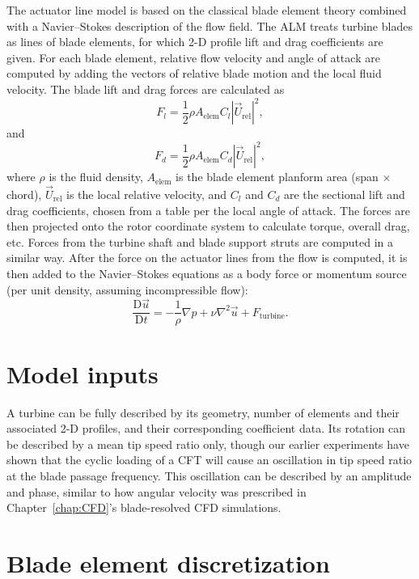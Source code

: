 The actuator line model is based on the classical blade element theory combined
with a Navier--Stokes description of the flow field. The ALM treats turbine
blades as lines of blade elements, for which 2-D profile lift and drag
coefficients are given. For each blade element, relative flow velocity and angle
of attack are computed by adding the vectors of relative blade motion and the
local fluid velocity. The blade lift and drag forces are calculated as
\begin{equation}
    F_l = \frac{1}{2} \rho A_\mathrm{elem} C_l |\vec{U}_\mathrm{rel}|^2,
\end{equation}
and
\begin{equation}
    F_d = \frac{1}{2} \rho A_\mathrm{elem} C_d |\vec{U}_\mathrm{rel}|^2,
\end{equation}
where $\rho$ is the fluid density, $A_\mathrm{elem}$ is the blade element
planform area (span $\times$ chord), $\vec{U}_\mathrm{rel}$ is the local
relative velocity, and $C_l$ and $C_d$ are the sectional lift and drag
coefficients, chosen from a table per the local angle of attack. The forces are
then projected onto the rotor coordinate system to calculate torque, overall
drag, etc. Forces from the turbine shaft and blade support struts are computed
in a similar way. After the force on the actuator lines from the flow is
computed, it is then added to the Navier--Stokes equations as a body force or
momentum source (per unit density, assuming incompressible flow):
\begin{equation}
    \frac{\mathrm{D} \vec{u}}{\mathrm{D} t} = - \frac{1}{\rho} \nabla p + \nu
    \nabla^2 \vec{u} + F_\mathrm{turbine}.
\end{equation}


\section{Model inputs}

A turbine can be fully described by its geometry, number of elements and their
associated 2-D profiles, and their corresponding coefficient data. Its rotation
can be described by a mean tip speed ratio only, though our earlier experiments
have shown that the cyclic loading of a CFT will cause an oscillation in tip
speed ratio at the blade passage frequency. This oscillation can be described by
an amplitude and phase, similar to how angular velocity was prescribed in
Chapter~\ref{chap:CFD}'s blade-resolved CFD simulations.


\section{Blade element discretization}


